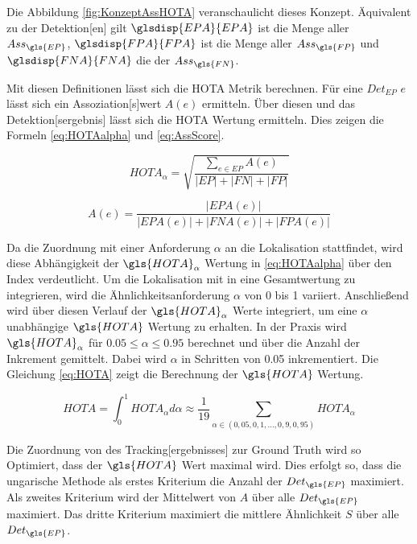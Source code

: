 Die Abbildung \ref{fig:KonzeptAssHOTA} veranschaulicht dieses Konzept. Äquivalent zu der \gls{Detektion}[en] gilt \(\glsdisp{EPA}{EPA}\) ist die Menge aller \(Ass_{\gls{EP}}\), \(\glsdisp{FPA}{FPA}\) ist die Menge aller \(Ass_{\gls{FP}}\) und \(\glsdisp{FNA}{FNA}\) die der \(Ass_{\gls{FN}}\).
    

Mit diesen Definitionen lässt sich die \gls{HOTA} Metrik berechnen. Für eine \(Det_{EP}\) \(e\) lässt sich ein \gls{Assoziation}[s]wert \(A(e)\) ermitteln. Über diesen und das \gls{Detektion}[sergebnis] lässt sich die \gls{HOTA} Wertung ermitteln. Dies zeigen die Formeln \ref{eq:HOTAalpha} und \ref{eq:AssScore}.

\begin{equation}
    \label{eq:HOTAalpha}
    HOTA_{\alpha} = \sqrt{\frac{\sum_{e \in EP} A(e)}{|EP| + |FN| + |FP|}}
\end{equation}

\begin{equation}
    \label{eq:AssScore}
    A(e) = \frac{|EPA(e)|}{|EPA(e)| + |FNA(e)| + |FPA(e)|}
\end{equation}

Da die Zuordnung mit einer Anforderung \(\alpha\) an die \gls{Lokalisation} stattfindet, wird diese Abhängigkeit der \(\gls{HOTA}_{\alpha}\) Wertung in \ref{eq:HOTAalpha} über den Index verdeutlicht. Um die \gls{Lokalisation} mit in eine Gesamtwertung zu integrieren, wird die Ähnlichkeitsanforderung \(\alpha\) von 0 bis 1 variiert. Anschließend wird über diesen Verlauf der \(\gls{HOTA}_{\alpha}\) Werte integriert, um eine \(\alpha\) unabhängige \(\gls{HOTA}\) Wertung zu erhalten. In der Praxis wird \(\gls{HOTA}_{\alpha}\) für \(0.05 \leq \alpha \leq 0.95\) berechnet und über die Anzahl der Inkrement gemittelt. Dabei wird \(\alpha\) in Schritten von 0.05 inkrementiert. Die Gleichung \ref{eq:HOTA} zeigt die Berechnung der \(\gls{HOTA}\) Wertung.

\begin{equation}
    \label{eq:HOTA}
    HOTA = \int_{0}^{1} HOTA_{\alpha} d\alpha \approx \frac{1}{19} \sum_{\alpha \in (0,05, 0,1, \dots, 0,9, 0,95)} HOTA_{\alpha}
\end{equation}

Die Zuordnung von des \gls{Tracking}[ergebnisses] zur \gls{Ground Truth} wird so Optimiert, dass der \(\gls{HOTA}\) Wert maximal wird. Dies erfolgt so, dass die ungarische Methode als erstes Kriterium die Anzahl der \({Det_{\gls{EP}}}\) maximiert. Als zweites Kriterium wird der Mittelwert von \(A\) über alle \({Det_{\gls{EP}}}\) maximiert. Das dritte Kriterium maximiert die mittlere Ähnlichkeit \(S\) über alle \({Det_{\gls{EP}}}\).\par

